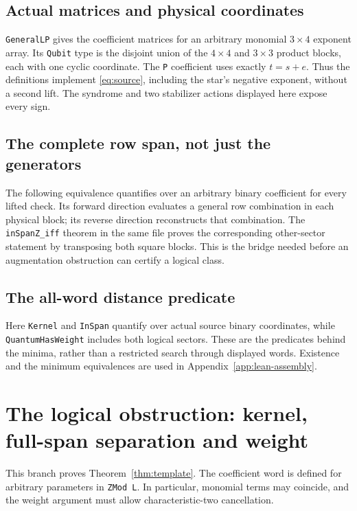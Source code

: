 \subsection{Actual matrices and physical coordinates}
\nolinkurl{GeneralLP} gives the coefficient matrices for an arbitrary monomial
$3\times4$ exponent array. Its \texttt{Qubit} type is the disjoint union of the
$4\times4$ and $3\times3$ product blocks, each with one cyclic coordinate.
The \texttt{P} coefficient uses exactly $t=s+e$. Thus the definitions implement
\eqref{eq:source}, including the star's negative exponent, without a second lift.
The syndrome and two stabilizer actions displayed here expose every sign.

\subsection{The complete row span, not just the generators}
The following equivalence quantifies over an arbitrary binary coefficient for
every lifted check. Its forward direction evaluates a general row combination
in each physical block; its reverse direction reconstructs that combination.
The \texttt{inSpanZ\_iff} theorem in the same file proves the corresponding
other-sector statement by transposing both square blocks. This is the bridge
needed before an augmentation obstruction can certify a logical class.

\subsection{The all-word distance predicate}
Here \texttt{Kernel} and \texttt{InSpan} quantify over actual source binary
coordinates, while \texttt{QuantumHasWeight} includes both logical sectors.
These are the predicates behind the minima, rather than a restricted search
through displayed words. Existence and the minimum equivalences are used in
Appendix~\ref{app:lean-assembly}.

\clearpage
\section{The logical obstruction: kernel, full-span separation and weight}\label{app:lean-obstruction}
This branch proves Theorem~\ref{thm:template}. The coefficient word is defined
for arbitrary parameters in \texttt{ZMod L}. In particular, monomial terms may
coincide, and the weight argument must allow characteristic-two cancellation.

